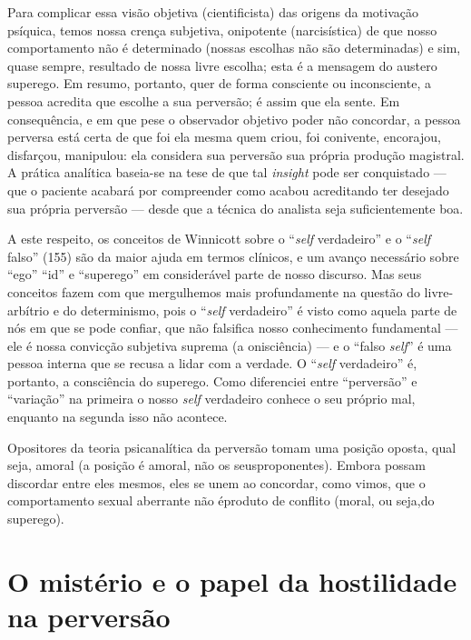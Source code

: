 Para complicar essa visão objetiva (cientificista) das origens da
motivação psíquica, temos nossa crença subjetiva, onipotente
(narcisística) de que nosso comportamento não é determinado (nossas
escolhas não são determinadas) e sim, quase sempre, resultado de nossa
livre escolha; esta é a mensagem do austero superego. Em resumo,
portanto, quer de forma consciente ou inconsciente, a pessoa acredita
que escolhe a sua perversão; é assim que ela sente. Em consequência, e
em que pese o observador objetivo poder não concordar, a pessoa
perversa está certa de que foi ela mesma quem criou, foi conivente,
encorajou, disfarçou, manipulou: ela considera sua perversão sua
própria produção magistral. A prática analítica baseia-se na tese de
que tal \textit{insight} pode ser conquistado --- que o paciente
acabará por compreender como acabou acreditando ter desejado sua
própria perversão --- desde que a técnica do analista seja
suficientemente boa.

A este respeito, os conceitos de\idxwinni{} Winnicott\idxself{} sobre o
``\textit{self} verdadeiro'' e o
``\textit{self} falso'' (155) são da maior
ajuda em termos clínicos, e um avanço necessário sobre
``ego'' ``id'' e ``superego'' em considerável parte de nosso
discurso. Mas seus conceitos fazem com que mergulhemos mais
profundamente na questão do livre-arbítrio e do determinismo, pois o
``\textit{self} verdadeiro'' é visto como
aquela parte de nós em que se pode confiar, que não falsifica nosso
conhecimento fundamental --- ele é nossa convicção subjetiva suprema
(a onisciência) --- e o ``falso \textit{self}'' é uma pessoa interna que se recusa a lidar
com a verdade. O ``\textit{self} verdadeiro''
é, portanto, a consciência do superego. Como diferenciei entre
``perversão'' e
``variação'' na primeira o nosso \textit{self} verdadeiro conhece
o seu próprio mal, enquanto na segunda isso não acontece.

Opositores da teoria psicanalítica da perversão tomam uma posição
oposta, qual seja, amoral (a posição é amoral, não os seus\idxlivre[|)]
proponentes). Embora possam discordar entre eles mesmos, eles se unem
ao concordar, como vimos, que o comportamento sexual aberrante não é\idxpervrespo[|)]
produto de conflito (moral, ou seja,\idxrespo[|)] do superego).


\section{O mistério e o papel da hostilidade na perversão}

